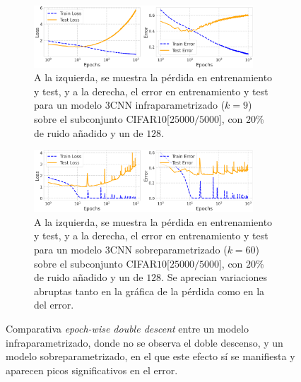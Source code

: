 \begin{figure}[h]
    \centering
    \begin{subfigure}[b]{\textwidth}
        \centering
        \includegraphics[width=0.9\textwidth]{img/experiments/epoch-wise3CNNunderparameterized.png}
        \caption{A la izquierda, se muestra la pérdida en entrenamiento y test, y a la derecha, el error en entrenamiento y test para un modelo $3$CNN infraparametrizado ($k=9$) sobre el subconjunto CIFAR$10$[$25000/5000$], con $20\%$ de ruido añadido y un  de $128$.}\label{fig:epoch-wise3CNNunderparameterized}
    \end{subfigure}
    
    \vspace{1em} 

    \begin{subfigure}[b]{\textwidth}
        \centering
        \includegraphics[width=0.9\textwidth]{img/experiments/epoch-wise3CNNoverparameterized.png}
        \caption{A la izquierda, se muestra la pérdida en entrenamiento y test, y a la derecha, el error en entrenamiento y test para un modelo $3$CNN sobreparametrizado ($k=60$) sobre el subconjunto CIFAR$10$[$25000/5000$], con $20\%$ de ruido añadido y un  de $128$. Se aprecian variaciones abruptas tanto en la gráfica de la pérdida como en la del error.}\label{fig:epoch-wise3CNNoverparameterized}
    \end{subfigure}
    
    \caption[Comparativa \textit{epoch-wise double descent} entre un modelo infraparametrizado y uno sobreparametrizado en el que aparecen picos significativos en el error.]{Comparativa \textit{epoch-wise double descent} entre un modelo infraparametrizado, donde no se observa el doble descenso, y un modelo sobreparametrizado, en el que este efecto sí se manifiesta y aparecen picos significativos en el error.}\label{fig:epoch-wise-bruscos1}
\end{figure}

